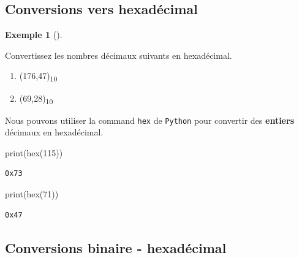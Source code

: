 \documentclass[
  letterpaper,
]{scrbook}
\newenvironment{Shaded}{}{}
\newcommand{\BuiltInTok}[1]{#1}
\newcommand{\DecValTok}[1]{\textcolor[rgb]{0.25,0.63,0.44}{#1}}
\newcommand{\NormalTok}[1]{#1}
\providecommand{\tightlist}{%
  \setlength{\itemsep}{0pt}\setlength{\parskip}{0pt}}\usepackage{longtable,booktabs,array}
\theoremstyle{definition}
\newtheorem{example}{Exemple}[chapter]
\theoremstyle{definition}
\theoremstyle{plain}
\theoremstyle{remark}
\begin{document}
\hypertarget{conversions-vers-hexaduxe9cimal}{%
\subsection{Conversions vers
hexadécimal}\label{conversions-vers-hexaduxe9cimal}}

\leavevmode{}%
\begin{example}[]\label{exm-conversion-decimal-hexadecimal}

Convertissez les nombres décimaux suivants en hexadécimal.

\begin{enumerate}
\def\labelenumi{\alph{enumi})}
\tightlist
\item
  (176,47)\textsubscript{10}
\item
  (69,28)\textsubscript{10}
\end{enumerate}

\end{example}

Nous pouvons utiliser la command \texttt{hex} de \texttt{Python} pour
convertir des \textbf{entiers} décimaux en hexadécimal.

\begin{Shaded}
\begin{Highlighting}[]
\BuiltInTok{print}\NormalTok{(}\BuiltInTok{hex}\NormalTok{(}\DecValTok{115}\NormalTok{))}
\end{Highlighting}
\end{Shaded}

\begin{verbatim}
0x73
\end{verbatim}

\begin{Shaded}
\begin{Highlighting}[]
\BuiltInTok{print}\NormalTok{(}\BuiltInTok{hex}\NormalTok{(}\DecValTok{71}\NormalTok{))}
\end{Highlighting}
\end{Shaded}

\begin{verbatim}
0x47
\end{verbatim}

\hypertarget{conversions-binaire---hexaduxe9cimal}{%
\subsection{Conversions binaire -
hexadécimal}\label{conversions-binaire---hexaduxe9cimal}}
\end{document}
